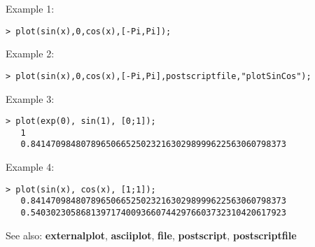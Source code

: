 \noindent Example 1: 
\begin{center}\begin{minipage}{14.8cm}\begin{Verbatim}[frame=single]
   > plot(sin(x),0,cos(x),[-Pi,Pi]);
\end{Verbatim}
\end{minipage}\end{center}
\noindent Example 2: 
\begin{center}\begin{minipage}{14.8cm}\begin{Verbatim}[frame=single]
   > plot(sin(x),0,cos(x),[-Pi,Pi],postscriptfile,"plotSinCos");
\end{Verbatim}
\end{minipage}\end{center}
\noindent Example 3: 
\begin{center}\begin{minipage}{14.8cm}\begin{Verbatim}[frame=single]
   > plot(exp(0), sin(1), [0;1]);
   1
   0.841470984807896506652502321630298999622563060798373
\end{Verbatim}
\end{minipage}\end{center}
\noindent Example 4: 
\begin{center}\begin{minipage}{14.8cm}\begin{Verbatim}[frame=single]
   > plot(sin(x), cos(x), [1;1]);
   0.841470984807896506652502321630298999622563060798373
   0.540302305868139717400936607442976603732310420617923
\end{Verbatim}
\end{minipage}\end{center}
See also: \textbf{externalplot}, \textbf{asciiplot}, \textbf{file}, \textbf{postscript}, \textbf{postscriptfile}
